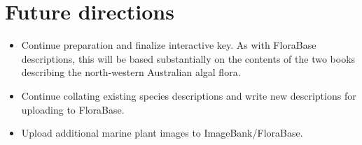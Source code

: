 \documentclass[version=last,
    paper=a4, %
    10pt, %
    usenames,
    dvipsnames,
    oneside, %
    headings=openany, %
    DIV=15 %
]{scrbook}
\begin{document}
\section*{Future directions}
\begin{itemize}
\itemsep1pt\parskip0pt
\item
  Continue preparation and finalize interactive key. As with FloraBase
  descriptions, this will be based substantially on the contents of the
  two books describing the north-western Australian algal flora.
\item
  Continue collating existing species descriptions and write new
  descriptions for uploading to FloraBase.
\item
  Upload additional marine plant images to ImageBank/FloraBase.
\end{itemize}



\end{document}
